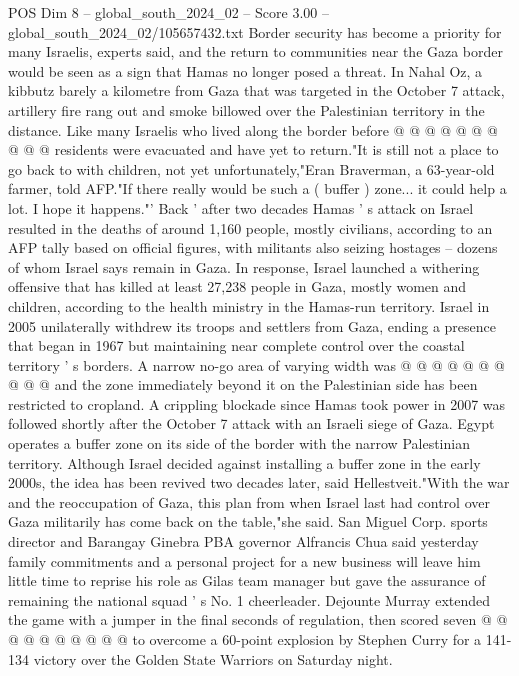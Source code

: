 \begin{textsample}{POS Dim 8 – global\_south\_2024\_02 – Score 3.00 – global\_south\_2024\_02/105657432.txt}
Border security has become a priority for many Israelis, experts said, and the return to communities near the Gaza border would be seen as a sign that Hamas no longer posed a threat.
In Nahal Oz, a kibbutz barely a kilometre from Gaza that was targeted in the October 7 attack, artillery fire rang out and smoke billowed over the Palestinian territory in the distance.
Like many Israelis who lived along the border before @ @ @ @ @ @ @ @ @ @ residents were evacuated and have yet to return."It is still not a place to go back to with children, not yet unfortunately,"Eran Braverman, a 63-year-old farmer, told AFP."If there really would be such a ( buffer ) zone... it could help a lot.
I hope it happens."' Back ' after two decades Hamas ' s attack on Israel resulted in the deaths of around 1,160 people, mostly civilians, according to an AFP tally based on official figures, with militants also seizing hostages -- dozens of whom Israel says remain in Gaza.
In response, Israel launched a withering offensive that has killed at least 27,238 people in Gaza, mostly women and children, according to the health ministry in the Hamas-run territory.
Israel in 2005 unilaterally withdrew its troops and settlers from Gaza, ending a presence that began in 1967 but maintaining near complete control over the coastal territory ' s borders.
A narrow no-go area of varying width was @ @ @ @ @ @ @ @ @ @ and the zone immediately beyond it on the Palestinian side has been restricted to cropland.
A crippling blockade since Hamas took power in 2007 was followed shortly after the October 7 attack with an Israeli siege of Gaza.
Egypt operates a buffer zone on its side of the border with the narrow Palestinian territory.
Although Israel decided against installing a buffer zone in the early 2000s, the idea has been revived two decades later, said Hellestveit."With the war and the reoccupation of Gaza, this plan from when Israel last had control over Gaza militarily has come back on the table,"she said.
San Miguel Corp. sports director and Barangay Ginebra PBA governor Alfrancis Chua said yesterday family commitments and a personal project for a new business will leave him little time to reprise his role as Gilas team manager but gave the assurance of remaining the national squad ' s No. 1 cheerleader.
Dejounte Murray extended the game with a jumper in the final seconds of regulation, then scored seven @ @ @ @ @ @ @ @ @ @ to overcome a 60-point explosion by Stephen Curry for a 141-134 victory over the Golden State Warriors on Saturday night.

\end{textsample}
